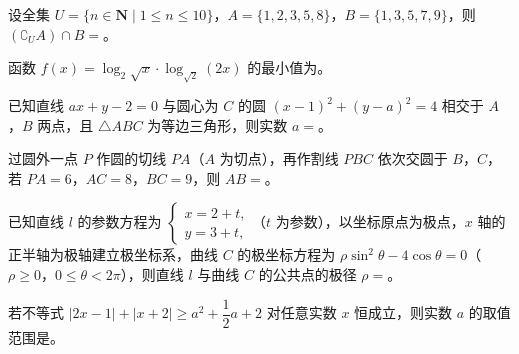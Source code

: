 \begin{question}
设全集 $U=\{n\in\mathbf N\mid 1\leqslant n\leqslant 10\}$，$A=\{1,2,3,5,8\}$，$B=\{1,3,5,7,9\}$，则 $(\complement_U A)\cap B=$\gkblank{}。

\end{question}
\begin{question}
函数 $f(x)=\log_2\sqrt x\cdot\log_{\sqrt2}(2x)$ 的最小值为\gkblank{}。

\end{question}
\begin{question}
已知直线 $ax+y-2=0$ 与圆心为 $C$ 的圆 $(x-1)^2+(y-a)^2=4$ 相交于 $A$，$B$ 两点，且 $\triangle ABC$ 为等边三角形，则实数 $a=$\gkblank{}。

\end{question}
\begin{question}
过圆外一点 $P$ 作圆的切线 $PA$（$A$ 为切点），再作割线 $PBC$ 依次交圆于 $B$，$C$，若 $PA=6$，$AC=8$，$BC=9$，则 $AB=$\gkblank{}。

\end{question}
\begin{question}
已知直线 $l$ 的参数方程为 $\begin{cases}x=2+t,\\y=3+t,\end{cases}$（$t$ 为参数），以坐标原点为极点，$x$ 轴的正半轴为极轴建立极坐标系，曲线 $C$ 的极坐标方程为 $\rho\sin^2\theta-4\cos\theta=0$（$\rho\geqslant 0$，$0\leqslant\theta<2\pi$），则直线 $l$ 与曲线 $C$ 的公共点的极径 $\rho=$\gkblank{}。

\end{question}
\begin{question}
若不等式 $|2x-1|+|x+2|\geqslant a^2+\dfrac12 a+2$ 对任意实数 $x$ 恒成立，则实数 $a$ 的取值范围是\gkblank{}。

\end{question}

